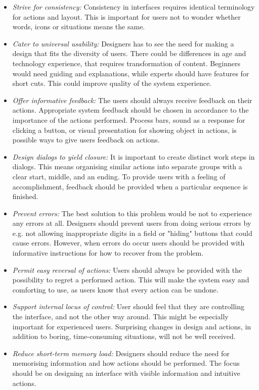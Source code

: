 \begin{itemize} 
\item \emph{Strive for consistency:} Consistency in interfaces requires identical terminology for actions and layout. This is important for users not to wonder whether words, icons or situations means the same. 
\item \emph{Cater to universal usability:} Designers has to see the need for making a design that fits the diversity of users. There could be differences in age and technology experience, that requires transformation of content. Beginners would need guiding and explanations, while experts should have features for short cuts. This could improve quality of the system experience. 
\item \emph{Offer informative feedback:} The users should always receive feedback on their actions. Appropriate system feedback should be chosen in accordance to the importance of the actions performed. Process bars, sound as a response for clicking a button, or visual presentation for showing object in actions, is possible ways to give users feedback on actions.  
\item \emph{Design dialogs to yield closure:} It is important to create distinct work steps in dialogs. This means organising similar actions into separate groups with a clear start, middle, and an ending. To provide users with a feeling of accomplishment, feedback should be provided when a particular sequence is finished.     
\item \emph{Prevent errors:} The best solution to this problem would be not to experience any errors at all. Designers should prevent users from doing serious errors by e.g. not allowing inappropriate digits in a field or "hiding" buttons that could cause errors. However, when errors do occur users should be provided with informative instructions for how to recover from the problem.   
\item \emph{Permit easy reversal of actions:} Users should always be provided with the possibility to regret a performed action. This will make the system easy and comforting to use, as users know that every action can be undone. 
\item \emph{Support internal locus of control:} User should feel that they are controlling the interface, and not the other way around. This might be especially important for experienced users. Surprising changes in design and actions, in addition to boring, time-consuming situations, will not be well received. 
\item \emph{Reduce short-term memory load:} Designers should reduce the need for memorising information and how actions should be performed. The focus should be on designing an interface with visible information and intuitive actions.
\end{itemize}

